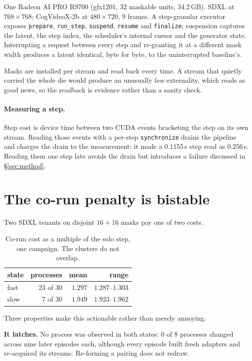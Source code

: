 \documentclass[sigconf,nonacm]{acmart}
\begin{document}
One Radeon AI PRO R9700 (gfx1201, 32 maskable units, 34.2\,GB). SDXL at
$768\times768$; CogVideoX-2b at $480\times720$, 9 frames. A step-granular
executor exposes \texttt{prepare}, \texttt{run\_step}, \texttt{suspend},
\texttt{resume} and \texttt{finalize}; suspension captures the latent,
the step index, the scheduler's internal cursor and the generator state.
Interrupting a request between every step and re-granting it at a
different mask width produces a latent identical, byte for byte, to the
uninterrupted baseline's.

Masks are installed per stream and read back every time. A stream that
quietly carried the whole die would produce an unusually \emph{low}
externality, which reads as good news, so the readback is evidence
rather than a sanity check.

\paragraph{Measuring a step.}
Step cost is device time between two CUDA events bracketing the step on
its own stream. Reading those events with a per-step
\texttt{synchronize} drains the pipeline and charges the drain to the
measurement: it made a $0.1155$\,s step read as $0.256$\,s. Reading them
one step late avoids the drain but introduces a failure discussed in
\S\ref{sec:method}.

\section{The co-run penalty is bistable}
\label{sec:bistable}

Two SDXL tenants on disjoint $16{+}16$ masks pay one of two costs.

\begin{table}[t]
\centering
\begin{tabular}{lrrr}
\toprule
state & processes & mean & range \\
\midrule
fast & 23 of 30 & $1.297$ & $1.287$--$1.303$ \\
slow & 7 of 30 & $1.949$ & $1.923$--$1.962$ \\
\bottomrule
\end{tabular}
\caption{Co-run cost as a multiple of the solo step, one campaign.
The clusters do not overlap.}
\end{table}

Three properties make this actionable rather than merely annoying.

\textbf{It latches.} No process was observed in both states: 0 of 8
processes changed across nine later episodes each, although every
episode built fresh adapters and re-acquired its streams. Re-forming a
pairing does not redraw.
\end{document}

